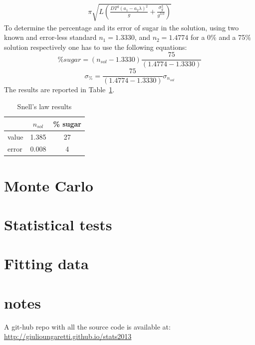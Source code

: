 \documentclass[twocolumn]{article}
\begin{document}
	\begin{multline}
	\pi \sqrt{L \left(\frac{DT^{2} \left(a_{1} - a_{2} \lambda\right)^{2}}{g} + \frac{\sigma_{g}^{2}}{g^{3.0}}\right)}
	\end{multline}
	To determine the percentage and its error of sugar in the solution, using two known and error-less standard $n_1 = 1.3330$, and $n_2 = 1.4774$ for a  0\% and a 75\% solution respectively one has to use the following equations:
	\begin{equation}
	\% sugar = ( n_{sol} - 1.3330) \frac{75}{ (1.4774- 1.3330)}
	\end{equation}
	\begin{equation}
		\sigma_{\%} = \frac{75}{ (1.4774- 1.3330)} \sigma_{n_{sol}}
	\end{equation}
	The results are reported in Table~\ref{tab:snell}.
	\begin{table}[h!]
		\caption{Snell's law results}
		\label{tab:snell}
		\begin{center}
			\begin{tabular}{l|cc}
			\hline

			\hline
			\textbf{} & \textbf {$n_{sol}$ } & \textbf{ \% sugar} \\
			\hline
				value & 1.385  & 27 \\
				error & 0.008 & 4 \\
			\hline

			\hline
			\end{tabular}
		\end{center}
	\end{table}

\section{Monte Carlo} %
\label{sec:monte_carlo}


\section{Statistical tests} %
\label{sec:statistical_tests}



\section{Fitting data} %
\label{sec:fitting_data}

\section{notes}
A git-hub repo with all the source code is available at:
\url{http://giulioungaretti.github.io/stats2013}
\end{document}

